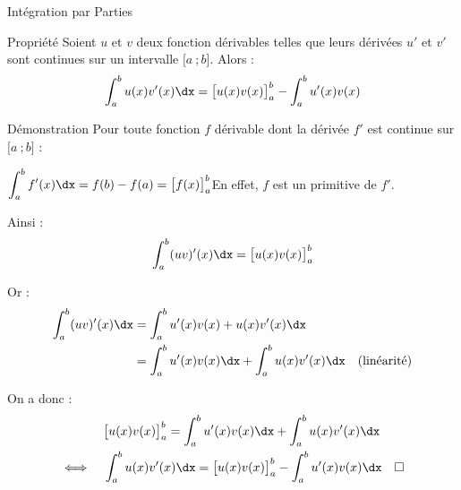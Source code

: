 \documentclass{cours}
\begin{document}
    \begin{Gpartie}{Intégration par Parties} 
        \begin{Spartie}{Propriété} 
            Soient $u$ et $v$ deux fonction dérivables telles que leurs dérivées $u'$ et $v'$ sont continues sur un intervalle $\big[a~;b\big]$. Alors : \[\int_a^b u(x)v'(x)\dx=\big[u(x)v(x)\big]_a^b-\int_a^b u'(x)v(x)\]
            \begin{SSpartie}{Démonstration} 
                Pour toute fonction $f$ dérivable dont la dérivée $f'$ est continue sur $\big[a~;b\big]$ :

                $\displaystyle \int_a^b f'(x)\dx=f(b)-f(a)=\big[f(x)\big]_a^b$\quad En effet, $f$ est un primitive de $f'$.

                Ainsi : \[\displaystyle \int_a^b (u v)'(x)\dx=\big[u(x)v(x)\big]_a^b\]

                Or : 
                \[\begin{aligned}[t]
                    \int_a^b (u v)'(x)\dx &= \int_a^b u'(x)v(x)+u(x)v'(x)\dx \\
                    &=\int_a^b u'(x)v(x)\dx + \int_a^b u(x)v'(x)\dx\quad\text{(linéarité)}
                \end{aligned}\]

                On a donc :
                \[\begin{aligned}[t]
                    &\quad\big[u(x)v(x)\big]_a^b = \int_a^b u'(x)v(x)\dx + \int_a^b u(x)v'(x)\dx \\
                    \iff&\quad\int_a^b u(x)v'(x)\dx=\big[u(x)v(x)\big]_a^b-\int_a^b u'(x)v(x)\dx\quad\square
                \end{aligned}\]
            \end{SSpartie}
        \end{Spartie}
    \end{Gpartie}
\end{document}
